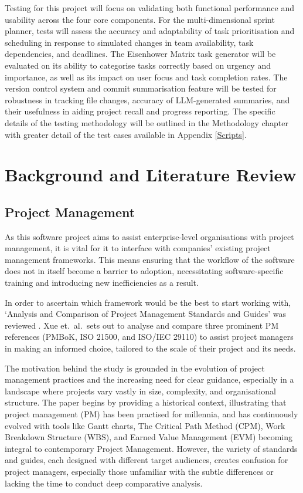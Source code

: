 \documentclass{report}
\begin{document}
Testing for this project will focus on validating both functional performance and usability across the four core components. 
For the multi-dimensional sprint planner, tests will assess the accuracy and adaptability of task prioritisation and scheduling in response to simulated changes in team availability, task dependencies, and deadlines. 
The Eisenhower Matrix task generator will be evaluated on its ability to categorise tasks correctly based on urgency and importance, as well as its impact on user focus and task completion rates.
The version control system and commit summarisation feature will be tested for robustness in tracking file changes, accuracy of LLM-generated summaries, and their usefulness in aiding project recall and progress reporting. 
The specific details of the testing methodology will be outlined in the Methodology chapter with greater detail of the test cases available in Appendix \ref{Scripts}.

\chapter{Background and Literature Review}  %
\section{Project Management}

As this software project aims to assist enterprise-level organisations with project management, it is vital for it to interface with companies' existing project management frameworks. 
This means ensuring that the workflow of the software does not in itself become a barrier to adoption, necessitating software-specific training and introducing new inefficiencies as a result.

In order to ascertain which framework would be the best to start working with, `Analysis and Comparison of Project Management Standards and Guides' was reviewed \parencite{xueAnalysisComparisonProject}.
Xue et.\ al.\ sets out to analyse and compare three prominent PM references (PMBoK, ISO 21500, and ISO/IEC 29110) to assist project managers in making an informed choice, tailored to the scale of their project and its needs.

The motivation behind the study is grounded in the evolution of project management practices and the increasing need for clear guidance, especially in a landscape where projects vary vastly in size, complexity, and organisational structure. 
The paper begins by providing a historical context, illustrating that project management (PM) has been practised for millennia, and has continuously evolved with tools like Gantt charts, The Critical Path Method (CPM), Work Breakdown Structure (WBS), and Earned Value Management (EVM) becoming integral to contemporary Project Management.  
However, the variety of standards and guides, each designed with different target audiences, creates confusion for project managers, especially those unfamiliar with the subtle differences or lacking the time to conduct deep comparative analysis.
\end{document}
